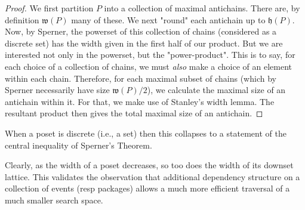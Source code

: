 \documentclass[hoptionsi,review,format=acmsmall]{acmart}
\newtheorem{lemma}[theorem]{Lemma}
\theoremstyle{definition}
\newcommand{\Wf}{\mathfrak{w}}
\newcommand{\Hf}{\mathfrak{h}}
\begin{document}
\begin{proof} 
We first partition \(P\) into a collection of maximal antichains. There are, by definition \(\Wf(P)\) many of these. We next "round" each antichain up to \(\Hf(P)\). Now, by Sperner, the powerset of this collection of chains (considered as a discrete set) has the width given in the first half of our product. But we are interested not only in the powerset, but the "power-product". This is to say, for each choice of a collection of chains, we must \textit{also} make a choice of an element within each chain. Therefore, for each maximal subset of chains (which by Sperner necessarily have size \(\Wf(P)/2\)), we calculate the maximal size of an antichain within it. For that, we make use of Stanley's width lemma. The resultant product then gives the total maximal size of an antichain.
\end{proof}

When a poset is discrete (i.e., a set) then this collapses to a statement of the central inequality of Sperner's Theorem.

Clearly, as the width of a poset decreases, so too does the width of its downset lattice. This validates the observation that additional dependency structure on a collection of events (resp packages) allows a much more efficient traversal of a much smaller search space.










\end{document}
